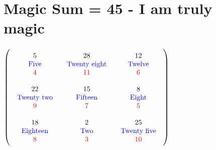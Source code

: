 \documentclass{article}
\begin{document}
\vspace{2em} 
\section{Magic Sum = 45 - I am truly magic}$ \left( \begin{array}{ccc}
\begin{array}{c}
\rule{0pt}{1.5em}5 \\ 
\text{\color{blue}Five} \\ 
\color{red}4 \vspace{.5em} 
\end{array} & \begin{array}{c}
\rule{0pt}{1.5em}28 \\ 
\text{\color{blue}Twenty eight} \\ 
\color{red}11 \vspace{.5em} 
\end{array} & \begin{array}{c}
\rule{0pt}{1.5em}12 \\ 
\text{\color{blue}Twelve} \\ 
\color{red}6 \vspace{.5em} 
\end{array}\\ 
\begin{array}{c}
\rule{0pt}{1.5em}22 \\ 
\text{\color{blue}Twenty two} \\ 
\color{red}9 \vspace{.5em} 
\end{array} & \begin{array}{c}
\rule{0pt}{1.5em}15 \\ 
\text{\color{blue}Fifteen} \\ 
\color{red}7 \vspace{.5em} 
\end{array} & \begin{array}{c}
\rule{0pt}{1.5em}8 \\ 
\text{\color{blue}Eight} \\ 
\color{red}5 \vspace{.5em} 
\end{array}\\ 
\begin{array}{c}
\rule{0pt}{1.5em}18 \\ 
\text{\color{blue}Eighteen} \\ 
\color{red}8 \vspace{.5em} 
\end{array} & \begin{array}{c}
\rule{0pt}{1.5em}2 \\ 
\text{\color{blue}Two} \\ 
\color{red}3 \vspace{.5em} 
\end{array} & \begin{array}{c}
\rule{0pt}{1.5em}25 \\ 
\text{\color{blue}Twenty five} \\ 
\color{red}10 \vspace{.5em} 
\end{array}\end{array} \right) $
\end{document}
